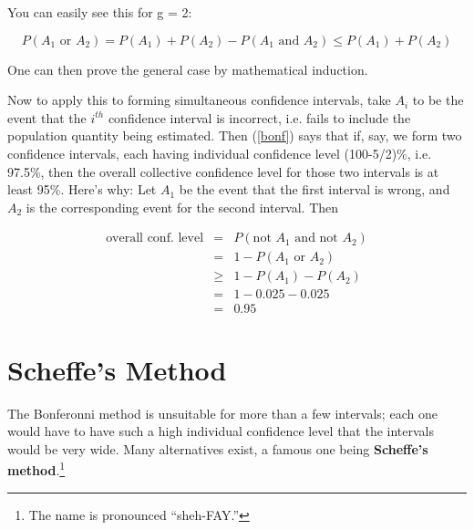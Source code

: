You can easily see this for g = 2: 

\begin{equation}
P(A_1 \textrm{ or } A_2) = P(A_1) + P(A_2) - P(A_1 \textrm{ and } A_2)
\leq  P(A_1) + P(A_2)
\end{equation}

One can then prove the general case by mathematical induction.

Now to apply this to forming simultaneous confidence intervals, take
$A_i$ to be the event that the $i^{th}$ confidence interval is
incorrect, i.e. fails to include the population quantity being
estimated.  Then (\ref{bonf}) says that if, say, we form two confidence
intervals, each having individual confidence level (100-5/2)\%, i.e.
97.5\%, then the overall collective confidence level for those two
intervals is at least 95\%.  Here's why:
Let $A_1$ be the event that the first interval is wrong, and $A_2$ is
the corresponding event for the second interval.  Then

\begin{eqnarray}
\textrm{overall conf. level} &=& P(\textrm{not } A_1 \textrm{ and not } A_2) \\ 
&=& 1 - P(A_1 \textrm{ or } A_2) \\
&\geq&  1 - P(A_1) - P(A_2) \\
&=& 1 - 0.025 - 0.025 \\
&=& 0.95
\end{eqnarray}

\section{Scheffe's Method}
\label{scheffe}

The Bonferonni method is unsuitable for more than a few intervals; each
one would have to have such a high individual confidence level that the
intervals would be very wide.  Many alternatives exist, a famous one
being {\bf Scheffe's method}.\footnote{The name is pronounced
``sheh-FAY.''}

